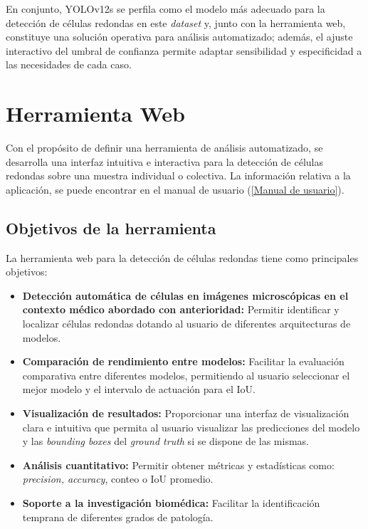 \documentclass[12pt,a4paper,onecolumn,oneside]{report}
\begin{document}
En conjunto, YOLOv12s se perfila como el modelo más adecuado para la detección de células redondas en este \textit{dataset} y, junto con la herramienta web, constituye una solución operativa para análisis automatizado; además, el ajuste interactivo del umbral 
de confianza permite adaptar sensibilidad y especificidad a las necesidades de cada caso.

\chapter{Herramienta Web} %
\label{Herramienta web}
Con el propósito de definir una herramienta de análisis automatizado, se desarrolla una interfaz intuitiva e interactiva para la detección 
de células redondas sobre una muestra individual o colectiva. La información relativa a la aplicación,
se puede encontrar en el manual de usuario (\autoref{Manual de usuario}).
\section{Objetivos de la herramienta}
\label{sec:Objetivos de la herramienta}

La herramienta web para la detección de células redondas tiene como principales objetivos:

\begin{itemize}
  \item{\textbf{Detección automática de células en imágenes microscópicas en el contexto médico abordado con anterioridad:} Permitir identificar
  y localizar células redondas dotando al usuario de diferentes arquitecturas de modelos.}
  \item{\textbf{Comparación de rendimiento entre modelos:} Facilitar la evaluación comparativa entre diferentes modelos,
  permitiendo al usuario seleccionar el mejor modelo y el intervalo de actuación para el IoU.}
  \item{\textbf{Visualización de resultados:} Proporcionar una interfaz de visualización clara e intuitiva que permita al usuario 
  visualizar las predicciones del modelo y las \textit{bounding boxes} del \textit{ground truth} si se dispone de las mismas.}
  \item{\textbf{Análisis cuantitativo:} Permitir obtener métricas y estadísticas como: \textit{precision, accuracy}, conteo o IoU promedio}.
  \item{\textbf{Soporte a la investigación biomédica:} Facilitar la identificación temprana de diferentes grados de patología.} 
\end{itemize}
\end{document}
